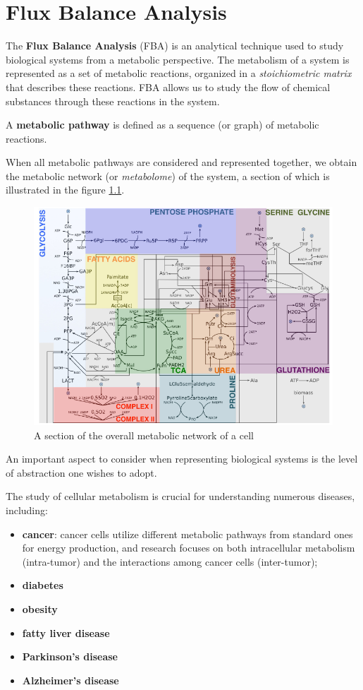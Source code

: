 \chapter{Flux Balance Analysis}

The \textbf{Flux Balance Analysis} (FBA) is an analytical technique used to 
study biological systems from a metabolic perspective. The metabolism of a 
system is represented as a set of metabolic reactions, organized in a 
\textit{stoichiometric matrix} that describes these reactions. FBA allows us to 
study the flow of chemical substances through these reactions in the system.

\begin{definition}
    A \textbf{metabolic pathway} is defined as a sequence (or graph) of 
    metabolic reactions.
\end{definition}

When all metabolic pathways are considered and represented together, we obtain 
the metabolic network (or \textit{metabolome}) of the system, a section of which 
is illustrated in the figure \ref{fig:pathway}.

\begin{figure}[!ht]
    \centering
    \includegraphics[width=0.5\linewidth]{img/pathway.png}
    \caption{A section of the overall metabolic network of a cell}
    \label{fig:pathway}
\end{figure}

An important aspect to consider when representing biological systems is the level 
of abstraction one wishes to adopt.

The study of cellular metabolism is crucial for understanding numerous diseases, including:
\begin{itemize}
    \item \textbf{cancer}: cancer cells utilize different metabolic pathways from 
        standard ones for energy production, and research focuses on both intracellular 
        metabolism (intra-tumor) and the interactions among cancer cells (inter-tumor);
    \item \textbf{diabetes}
    \item \textbf{obesity}
    \item \textbf{fatty liver disease}
    \item \textbf{Parkinson's disease}
    \item \textbf{Alzheimer's disease}
\end{itemize}

